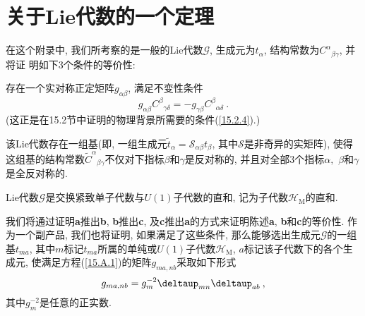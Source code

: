\section{关于Lie代数的一个定理}

在这个附录中, 我们所考察的是一般的Lie代数$\mathscr{G}$, 生成元为$t_{\alpha }$, 结构常数为$C^{\alpha }{}_{\beta \gamma }$, 并将证%
明如下3个条件的等价性:

 存在一个实对称正定矩阵$g_{\alpha \beta }$, 满足不变性条件
\begin{equation}
g_{\alpha \beta }C^{\beta}{}_{\gamma \delta }=-g_{\gamma \beta
}C^{\beta }{}_{\alpha \delta }\:.   \label{15.A.1}
\end{equation}%
(这正是在15.2节中证明的物理背景所需要的条件(\ref{15.2.4}).)

 该Lie代数存在一组基(即, 一组生成元$\tilde{t}_{\alpha }=\mathscr{S}%
_{\alpha \beta }t_{\beta }$, 其中$\mathscr{S}$是非奇异的实矩阵), 使得这组基的结构常数$\tilde{C}^{\alpha }{}_{\beta \gamma }$不仅对下指标$\beta $和$\gamma $是反对称的, 并且对全部3个指标$\alpha ,$ $\beta $和$\gamma $是全反对称的.

 Lie代数$\mathscr{G}$是交换紧致单子代数与$U(1)$子代数的直和, 记为子代数$\mathscr{H}_{\mathrm{M}}$的直和.

\noindent 我们将通过证明{\bf{a}}推出{\bf{b}}, {\bf{b}}推出{\bf{c}}, 及{\bf{c}}推出{\bf{a}}的方式来证明陈述{\bf{a}}, 
{\bf{b}}和{\bf{c}}的等价性. 作为一个副产品, 我们也将证明, 如果满足了这些条件,
那么能够选出生成元$\mathscr{G}$的一组基$t_{ma}$, 其中$m$标记$t_{ma}$所属的单纯或$U(1)$子代数$%
\mathscr{H}_{\mathrm{M}}$, $a$标记该子代数下的各个生成元, 使满足方程(\ref{15.A.1})的矩阵$g_{ma,nb}$采取如下形式
\begin{equation}
g_{ma,nb}=g_{m}^{-2}\deltaup _{mn}\deltaup _{ab}\:,   \label{15.A.2} \end{equation}%
其中$g_{m}^{-2}$是任意的正实数.

